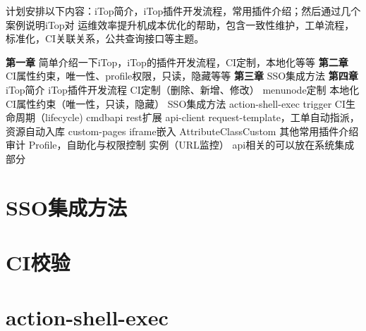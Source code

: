 \documentclass[fancyhdr,bookmark]{ctexbook}
\begin{document}
计划安排以下内容：iTop简介，iTop插件开发流程，常用插件介绍；然后通过几个案例说明iTop对
运维效率提升机成本优化的帮助，包含一致性维护，工单流程，标准化，CI关联关系，公共查询接口等主题。

\textbf{第一章} 简单介绍一下iTop，iTop的插件开发流程，CI定制，本地化等等
\textbf{第二章} CI属性约束，唯一性、profile权限，只读，隐藏等等
\textbf{第三章} SSO集成方法 \textbf{第四章} iTop简介 iTop插件开发流程
CI定制（删除、新增、修改） menunode定制 本地化
CI属性约束（唯一性，只读，隐藏） SSO集成方法 action-shell-exec trigger
CI生命周期（lifecycle) cmdbapi rest扩展 api-client
request-template，工单自动指派，资源自动入库 custom-pages iframe嵌入
AttributeClassCustom 其他常用插件介绍 审计 Profile，自助化与权限控制
实例（URL监控） api相关的可以放在系统集成部分


{
\hypersetup{linkcolor=black}
\setcounter{tocdepth}{2}
\tableofcontents
{}
}
\listoftables
{}
\listoffigures
{}



\mainmatter
\chapter{SSO集成方法}\label{ssoux96c6ux6210ux65b9ux6cd5}

\chapter{CI校验}\label{ciux6821ux9a8c}

\chapter{action-shell-exec}\label{action-shell-exec}

\backmatter
\end{document}
